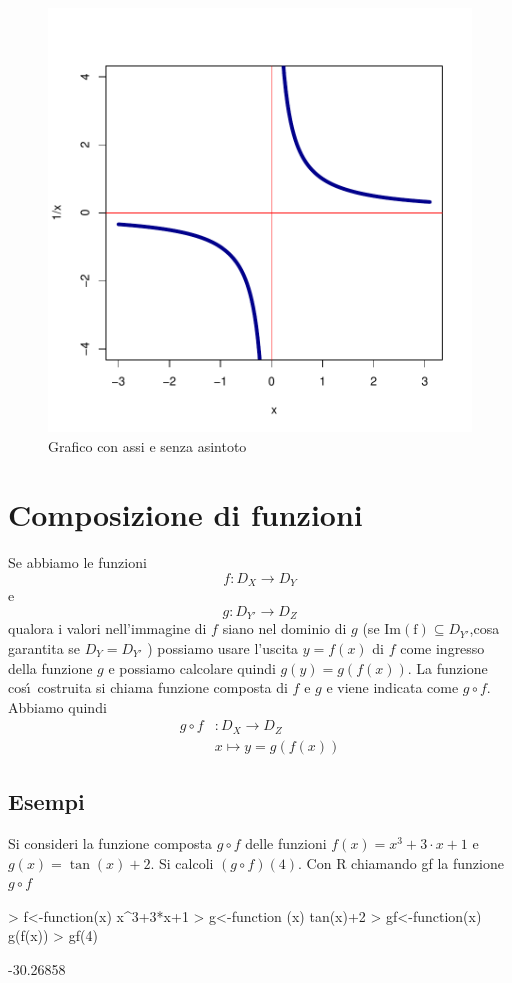 \documentclass[onecolumn,11pt]{book}
\begin{document}
\begin{itemize}
\begin{itemize}
\begin{figure}[ htbp]
\begin{center}
\includegraphics{Rmatematica-090}
\caption{Grafico con assi e senza asintoto}
\label{fig:noasint}
\end{center}
\end{figure}
\end{itemize}
\end{itemize}


\section{Composizione di funzioni}
Se abbiamo  le funzioni
\[f\colon D_X   \rightarrow D_Y\]
e
\[g\colon D_{Y'}   \rightarrow D_Z\]
qualora i valori nell'immagine di $f$ siano nel dominio di $g$  (se $\mathrm{Im(f)}  \subseteq D_{Y'}$,cosa garantita se $D_Y=D_{Y'}$ ) possiamo usare l'uscita $y=f(x)$ di $f $ come ingresso della funzione $g$ e possiamo calcolare quindi
 $g(y)=g(f(x))$.
 La funzione cos\'\i~costruita si chiama funzione composta di $f$ e $g$ e viene indicata come
 $g\circ f$. 
 Abbiamo quindi
 \begin{align*} g\circ f&\colon D_X\rightarrow D_Z\\
 &x\mapsto y=g(f(x))\end{align*}
 
 
\subsection{Esempi}
Si consideri la funzione composta $g\circ f$ delle funzioni $f(x)=x^3+3 \cdot x+1$ e $g(x)=\tan(x)+2$.
Si calcoli $(g\circ f)(4)$. Con R chiamando gf la funzione $g\circ f$
\begin{Schunk}
\begin{Sinput}
> f<-function(x) x^3+3*x+1
> g<-function (x)  tan(x)+2
> gf<-function(x) g(f(x))
> gf(4)
\end{Sinput}
\begin{Soutput}
[1] -30.26858
\end{Soutput}
\end{Schunk}
\end{document}
